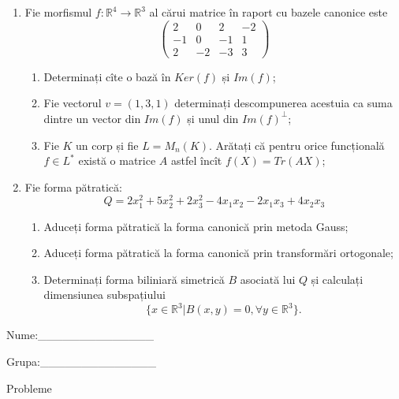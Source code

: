 \documentclass{article}
\begin{document}
\begin{enumerate}
 \item Fie morfismul $f:\mathbb{R}^4 \to \mathbb{R}^3$ al cărui matrice în raport cu bazele canonice este
$$\begin{pmatrix}
2&0&2&-2\\
-1&0&-1&1\\
2&-2&-3&3
\end{pmatrix}$$

\begin{enumerate}
\item Determinați cîte o bază în $Ker(f)$ și $Im(f)$;
\item Fie vectorul $v=(1,3,1)$ determinați descompunerea acestuia ca suma dintre un vector din $Im(f)$ și unul din $Im(f)^\perp$;
\item Fie $K$ un corp și fie $L=M_n(K)$. Arătați că pentru orice funcțională $f \in L^*$ există o matrice $A$ astfel încît $f(X)=Tr(AX)$;
\end{enumerate}
\item Fie forma pătratică:
$$Q= 2x_1^2+5x_2^2+2x_3^2-4x_1x_2-2x_1x_3+4x_2x_3$$

\begin{enumerate}
\item Aduceți forma pătratică la forma canonică prin metoda Gauss;
\item Aduceți forma pătratică la forma canonică prin transformări ortogonale;
\item Determinați forma biliniară simetrică $B$ asociată lui $Q$ și calculați dimensiunea subspațiului
$$\{x \in \mathbb{R}^3 | B(x,y)=0,\forall y \in \mathbb{R}^3\}.$$

\end{enumerate}
\end{enumerate}
\newpage
\begin{flushright}
Nume:\_\_\_\_\_\_\_\_\_\_\_\_\_\_
 
 
Grupa:\_\_\_\_\_\_\_\_\_\_\_\_\_\_
\end{flushright}
\begin{center}
\vspace{2cm}
{\Large Probleme}
\vspace{2cm}
\end{center}
\end{document}
